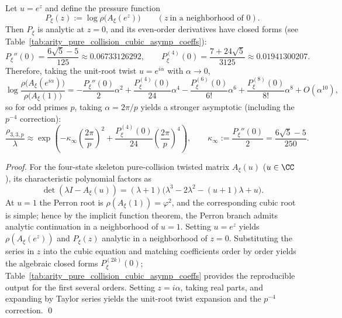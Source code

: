 \begin{proposition}\label{prop:arity-collision-quadratic-closed}
Let \(u=e^{z}\) and define the pressure function
$$
P_\xi(z):=\log\rho\bigl(A_\xi(e^{z})\bigr)\qquad(z\ \text{in a neighborhood of }0).
$$
Then \(P_\xi\) is analytic at \(z=0\), and its even-order derivatives have closed forms (see Table~\ref{tab:arity_pure_collision_cubic_asymp_coeffs}):
$$
P_\xi''(0)=\frac{6\sqrt5-5}{125}\approx 0.06733126292,
\qquad
P_\xi^{(4)}(0)=\frac{7+24\sqrt5}{3125}\approx 0.01941300207.
$$
Therefore, taking the unit-root twist \(u=e^{i\alpha}\) with \(\alpha\to 0\),
$$
\log\frac{\rho\bigl(A_\xi(e^{i\alpha})\bigr)}{\rho\bigl(A_\xi(1)\bigr)}
=-\frac{P_\xi''(0)}{2}\alpha^2+\frac{P_\xi^{(4)}(0)}{24}\alpha^4-\frac{P_\xi^{(6)}(0)}{6!}\alpha^6+\frac{P_\xi^{(8)}(0)}{8!}\alpha^8+O(\alpha^{10}),
$$
so for odd primes \(p\), taking \(\alpha=2\pi/p\) yields a stronger asymptotic (including the \(p^{-4}\) correction):
$$
\frac{\rho_{3,3,p}}{\lambda}
\approx
\exp\!\left(
-\kappa_\infty\left(\frac{2\pi}{p}\right)^2+\frac{P_\xi^{(4)}(0)}{24}\left(\frac{2\pi}{p}\right)^4
\right),
\qquad
\kappa_\infty:=\frac{P_\xi''(0)}{2}=\frac{6\sqrt5-5}{250}.
$$
\end{proposition}

\begin{proof}
For the four-state skeleton pure-collision twisted matrix \(A_\xi(u)\) (\(u\in\CC\)), its characteristic polynomial factors as
$$
\det(\lambda I-A_\xi(u))=(\lambda+1)\bigl(\lambda^3-2\lambda^2-(u+1)\lambda+u\bigr).
$$
At \(u=1\) the Perron root is \(\rho(A_\xi(1))=\varphi^2\), and the corresponding cubic root is simple; hence by the implicit function theorem, the Perron branch admits analytic continuation in a neighborhood of \(u=1\).
Setting \(u=e^z\) yields \(\rho(A_\xi(e^z))\) and \(P_\xi(z)\) analytic in a neighborhood of \(z=0\).
Substituting the series in \(z\) into the cubic equation and matching coefficients order by order yields the algebraic closed forms \(P_\xi^{(2k)}(0)\); Table~\ref{tab:arity_pure_collision_cubic_asymp_coeffs} provides the reproducible output for the first several orders.
Setting \(z=i\alpha\), taking real parts, and expanding by Taylor series yields the unit-root twist expansion and the \(p^{-4}\) correction. \qed
\end{proof}

